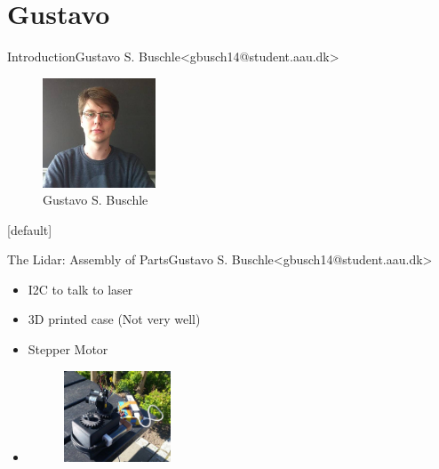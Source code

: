 \section{Gustavo}

\begin{frame}{Introduction}{Gustavo S. Buschle\newline<gbusch14@student.aau.dk>}
    \begin{figure}[h!]
        \includegraphics[width=0.3\textwidth]{images/gustavo.jpg}
        \caption{Gustavo S. Buschle}
        \centering
    \end{figure}
\end{frame}
[default]

\begin{frame}{The Lidar: Assembly of Parts}{Gustavo S. Buschle\newline<gbusch14@student.aau.dk>}
    \begin{itemize}
        \item <1-> I2C to talk to laser
        \item <2-> 3D printed case (Not very well)
        \item <3-> Stepper Motor
        \item <2-2> \begin{figure}
            \includegraphics[width=0.3\textwidth]{images/lidarpi.jpg}
        \end{figure}
    \end{itemize}
\end{frame}

